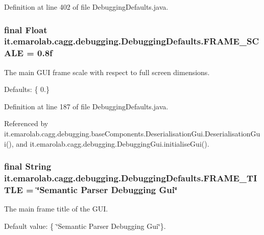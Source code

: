 Definition at line 402 of file Debugging\-Defaults.\-java.

\hypertarget{classit_1_1emarolab_1_1cagg_1_1debugging_1_1DebuggingDefaults_ac7a249bc5d3996da2a64c5cd405cffe3}{
\subsubsection[{F\-R\-A\-M\-E\-\_\-\-S\-C\-A\-L\-E}]{\setlength{\rightskip}{0pt plus 5cm}final Float it.\-emarolab.\-cagg.\-debugging.\-Debugging\-Defaults.\-F\-R\-A\-M\-E\-\_\-\-S\-C\-A\-L\-E = 0.\-8f\hspace{0.3cm}{\ttfamily [static]}}}\label{classit_1_1emarolab_1_1cagg_1_1debugging_1_1DebuggingDefaults_ac7a249bc5d3996da2a64c5cd405cffe3}
The main G\-U\-I frame scale with respect to full screen dimensions.\par
 Defaults\-: \{ 0.\} 

Definition at line 187 of file Debugging\-Defaults.\-java.



Referenced by it.\-emarolab.\-cagg.\-debugging.\-base\-Components.\-Deserialisation\-Gui.\-Deserialisation\-Gui(), and it.\-emarolab.\-cagg.\-debugging.\-Debugging\-Gui.\-initialise\-Gui().

\hypertarget{classit_1_1emarolab_1_1cagg_1_1debugging_1_1DebuggingDefaults_adccb511bb50e7aa10bf058cf364a97da}{
\subsubsection[{F\-R\-A\-M\-E\-\_\-\-T\-I\-T\-L\-E}]{\setlength{\rightskip}{0pt plus 5cm}final String it.\-emarolab.\-cagg.\-debugging.\-Debugging\-Defaults.\-F\-R\-A\-M\-E\-\_\-\-T\-I\-T\-L\-E = \char`\"{}Semantic Parser Debugging Gui\char`\"{}\hspace{0.3cm}{\ttfamily [static]}}}\label{classit_1_1emarolab_1_1cagg_1_1debugging_1_1DebuggingDefaults_adccb511bb50e7aa10bf058cf364a97da}
The main frame title of the G\-U\-I. \par
 Default value\-: \{ \char`\"{}\-Semantic Parser Debugging Gui\char`\"{}\}. 

